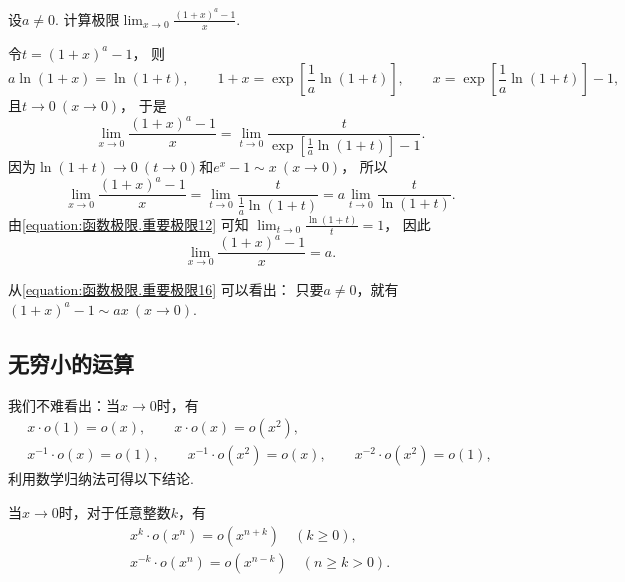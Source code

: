 \begin{example}
设\(a\neq0\).
计算极限\(\lim_{x\to0} \frac{(1+x)^a-1}x\).
\begin{solution}
令\(t = (1+x)^a-1\)，
则\[
	a \ln(1+x) = \ln(1+t),
	\qquad
	1+x=\exp[\frac1a \ln(1+t)],
	\qquad
	x=\exp[\frac1a \ln(1+t)]-1,
\]
且\(t\to0\ (x\to0)\)，
于是\[
	\lim_{x\to0} \frac{(1+x)^a-1}x
	= \lim_{t\to0} \frac{t}{\exp[\frac1a \ln(1+t)]-1}.
\]
因为\(\ln(1+t)\to0\ (t\to0)\)和\(e^x-1 \sim x\ (x\to0)\)，
所以\[
	\lim_{x\to0} \frac{(1+x)^a-1}x
	= \lim_{t\to0} \frac{t}{\frac1a \ln(1+t)}
	= a \lim_{t\to0} \frac{t}{\ln(1+t)}.
\]
由\cref{equation:函数极限.重要极限12} 可知
\(\lim_{t\to0} \frac{\ln(1+t)}{t} = 1\)，
因此\begin{equation}\label{equation:函数极限.重要极限16}
	\lim_{x\to0} \frac{(1+x)^a-1}x
	= a.
\end{equation}
\end{solution}
\end{example}
\begin{remark}
从\cref{equation:函数极限.重要极限16} 可以看出：
只要\(a\neq0\)，就有\((1+x)^a-1 \sim ax\ (x\to0)\).
\end{remark}

\subsection{无穷小的运算}
我们不难看出：当\(x\to0\)时，有\begin{gather*}
	x \cdot o(1) = o(x), \qquad
	x \cdot o(x) = o(x^2), \\
	x^{-1} \cdot o(x) = o(1), \qquad
	x^{-1} \cdot o(x^2) = o(x), \qquad
	x^{-2} \cdot o(x^2) = o(1),
\end{gather*}
利用数学归纳法可得以下结论.
\begin{proposition}
当\(x\to0\)时，对于任意整数\(k\)，有\begin{gather}
	x^k \cdot o(x^n) = o(x^{n+k})
	\quad(k \geq 0), \\
	x^{-k} \cdot o(x^n) = o(x^{n-k})
	\quad(n \geq k > 0).
\end{gather}
\end{proposition}

